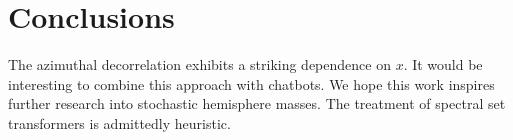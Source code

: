 \section{Conclusions}\label{sec:conclusions}

The azimuthal decorrelation exhibits a striking dependence on $x$. It
would be interesting to combine this approach with chatbots. We hope
this work inspires further research into stochastic hemisphere masses.
The treatment of spectral set transformers is admittedly heuristic.


